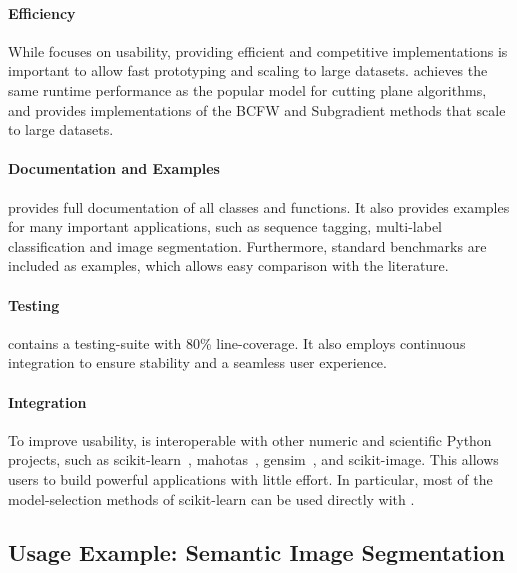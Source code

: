 \paragraph{Efficiency}
     While \pystruct focuses on usability, providing efficient and competitive
     implementations is important to allow fast prototyping and scaling to
     large datasets. \pystruct achieves the same runtime performance
     as the popular \svmstruct model for cutting plane algorithms, and
     provides implementations of the BCFW and Subgradient methods that scale to
     large datasets.

\paragraph{Documentation and Examples}
     \pystruct provides full documentation of all classes and functions.  It
     also provides examples for many important applications, such as
     sequence tagging, multi-label classification and image segmentation.
     Furthermore, standard benchmarks are included as examples, which allows
     easy comparison with the literature.

\paragraph{Testing}
     \pystruct contains a testing-suite with 80\% line-coverage. It also
     employs continuous integration to ensure stability and a seamless user
     experience.

\paragraph{Integration}
     To improve usability, \pystruct is interoperable with other numeric and
     scientific Python projects, such as {\sc
     scikit-learn}~\citep{pedregosa2011scikit},
     {\sc mahotas}~\citep{coelho:mahotas}, {\sc gensim}~\citep{rehurek_lrec},
     and {\sc scikit-image}.  This allows users to build powerful applications
     with little effort. In particular, most of the model-selection methods of
     {\sc scikit-learn} can be used directly with \pystruct.


\subsection{Usage Example: Semantic Image Segmentation}\label{sec:examples}

